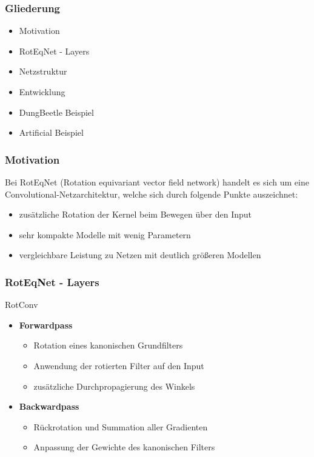 \begin{frame}
	\frametitle{Gliederung}
	\begin{itemize}
		\item Motivation
		\item RotEqNet - Layers
		\item Netzstruktur
		\item Entwicklung
		\item DungBeetle Beispiel
		\item Artificial Beispiel
	\end{itemize}
\end{frame}

\begin{frame}
	\frametitle{Motivation}
	Bei RotEqNet (Rotation equivariant vector field network) handelt es sich um eine Convolutional-Netzarchitektur, welche sich durch folgende Punkte auszeichnet:
	\begin{itemize}
		\item zusätzliche Rotation der Kernel beim Bewegen über den Input
		\item sehr kompakte Modelle mit wenig Parametern
		\item vergleichbare Leistung zu Netzen mit deutlich größeren Modellen
		
	\end{itemize}
\end{frame}

\begin{frame}
	\frametitle{RotEqNet - Layers}
	\begin{block}{RotConv}
		\begin{itemize}
			\item[] \textbf{Forwardpass}
			\begin{itemize}
				\item Rotation eines kanonischen Grundfilters
				\item Anwendung der rotierten Filter auf den Input
				\item zusätzliche Durchpropagierung des Winkels
			\end{itemize}
			\item[] \textbf{Backwardpass}
			\begin{itemize}
				\item Rückrotation und Summation aller Gradienten
				\item Anpassung der Gewichte des kanonischen Filters
			\end{itemize}
		\end{itemize}
	\end{block}
\end{frame}

